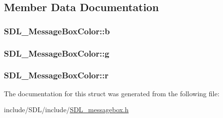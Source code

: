 \subsection{Member Data Documentation}
\hypertarget{struct_s_d_l___message_box_color_ad1215a42167cb5b190ff8f19dbd42066}{
\subsubsection[{b}]{ S\-D\-L\-\_\-\-Message\-Box\-Color\-::b}}\label{struct_s_d_l___message_box_color_ad1215a42167cb5b190ff8f19dbd42066}
\hypertarget{struct_s_d_l___message_box_color_a5820adab0b32aa3eade101ea36ed6b4a}{
\subsubsection[{g}]{ S\-D\-L\-\_\-\-Message\-Box\-Color\-::g}}\label{struct_s_d_l___message_box_color_a5820adab0b32aa3eade101ea36ed6b4a}
\hypertarget{struct_s_d_l___message_box_color_a43ab2172c10058380fcf67ecc3f53184}{
\subsubsection[{r}]{ S\-D\-L\-\_\-\-Message\-Box\-Color\-::r}}\label{struct_s_d_l___message_box_color_a43ab2172c10058380fcf67ecc3f53184}


The documentation for this struct was generated from the following file\-:\begin{DoxyCompactItemize}
\item 
include/\-S\-D\-L/include/\hyperlink{_s_d_l__messagebox_8h}{S\-D\-L\-\_\-messagebox.\-h}\end{DoxyCompactItemize}
